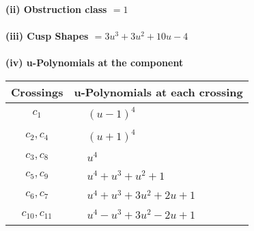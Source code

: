 \documentclass[1p]{elsarticle_modified}
\theoremstyle{definition}
\begin{document}
\flushleft \textbf{(ii) Obstruction class $= 1$}\\~\\
\flushleft \textbf{(iii) Cusp Shapes $= 3 u^3+3 u^2+10 u-4$}\\~\\
\newpage\renewcommand{\arraystretch}{1}
\flushleft \textbf{(iv) u-Polynomials at the component}\newline \\
\begin{tabular}{m{50pt}|m{274pt}}
Crossings & \hspace{64pt}u-Polynomials at each crossing \\
\hline $$\begin{aligned}c_{1}\end{aligned}$$&$\begin{aligned}
&(u-1)^4
\end{aligned}$\\
\hline $$\begin{aligned}c_{2},c_{4}\end{aligned}$$&$\begin{aligned}
&(u+1)^4
\end{aligned}$\\
\hline $$\begin{aligned}c_{3},c_{8}\end{aligned}$$&$\begin{aligned}
&u^4
\end{aligned}$\\
\hline $$\begin{aligned}c_{5},c_{9}\end{aligned}$$&$\begin{aligned}
&u^4+u^3+u^2+1
\end{aligned}$\\
\hline $$\begin{aligned}c_{6},c_{7}\end{aligned}$$&$\begin{aligned}
&u^4+u^3+3 u^2+2 u+1
\end{aligned}$\\
\hline $$\begin{aligned}c_{10},c_{11}\end{aligned}$$&$\begin{aligned}
&u^4- u^3+3 u^2-2 u+1
\end{aligned}$\\
\hline
\end{tabular}\\~\\
\end{document}
